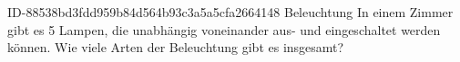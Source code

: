 \begin{exercise}
      {ID-88538bd3fdd959b84d564b93c3a5a5cfa2664148}
      {Beleuchtung}
  \ifproblem\problem
    In einem Zimmer gibt es 5 Lampen, die unabhängig voneinander aus- und
    eingeschaltet werden können. Wie viele Arten der Beleuchtung gibt es
    insgesamt?
  \fi
\end{exercise}

